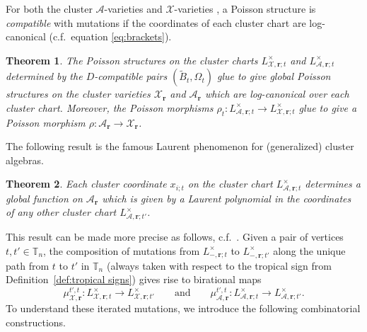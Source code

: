 \documentclass{amsart}
\newtheorem{theorem}{Theorem}[section]
\numberwithin{equation}{section}
\newcommand{\bfr}{{\boldsymbol{r}}}
\newcommand{\cA}{\mathcal{A}}
\newcommand{\cX}{\mathcal{X}}
\newcommand{\TT}{\mathbb{T}}
\begin{document}
For both the cluster $\cA$-varieties \cite{GSV10} and $\cX$-varieties \cite{FG09c}, a Poisson structure is \emph{compatible} with mutations if the coordinates of each cluster chart are log-canonical (c.f.\ equation \eqref{eq:brackets}).
\begin{theorem}
  \cite{GSV10}
  The Poisson structures on the cluster charts $L^\times_{\cX,\bfr;t}$ and $L^\times_{\cA,\bfr;t}$ determined by the $D$-compatible pairs $(\tilde B_t,\Omega_t)$ glue to give global Poisson structures on the cluster varieties $\cX_\bfr$ and $\cA_\bfr$ which are log-canonical over each cluster chart.
  Moreover, the Poisson morphisms $\rho_t:L^\times_{\cA,\bfr;t}\to L^\times_{\cX,\bfr;t}$ glue to give a Poisson morphism $\rho:\cA_\bfr\to\cX_\bfr$.
\end{theorem}

The following result is the famous Laurent phenomenon for (generalized) cluster algebras.
\begin{theorem}
  \cite{FZ02,CS14}
  Each cluster coordinate $x_{i;t}$ on the cluster chart $L^\times_{\cA,\bfr;t}$ determines a global function on $\cA_\bfr$ which is given by a Laurent polynomial in the coordinates of any other cluster chart $L^\times_{\cA,\bfr;t'}$.
\end{theorem}

This result can be made more precise as follows, c.f.\ \cite{FZ07,Nak15,NR16}.
Given a pair of vertices $t,t'\in\TT_n$, the composition of mutations from $L^\times_{-,\bfr;t}$ to $L^\times_{-,\bfr;t'}$ along the unique path from $t$ to $t'$ in $\TT_n$ (always taken with respect to the tropical sign from Definition~\ref{def:tropical signs}) gives rise to birational maps
\[\mu_{\cX,\bfr}^{t',t}:L^\times_{\cX,\bfr;t}\to L^\times_{\cX,\bfr;t'}\qquad\text{and}\qquad\mu_{\cA,\bfr}^{t',t}:L^\times_{\cA,\bfr;t}\to L^\times_{\cA,\bfr;t'}.\]
To understand these iterated mutations, we introduce the following combinatorial constructions.
\end{document}
